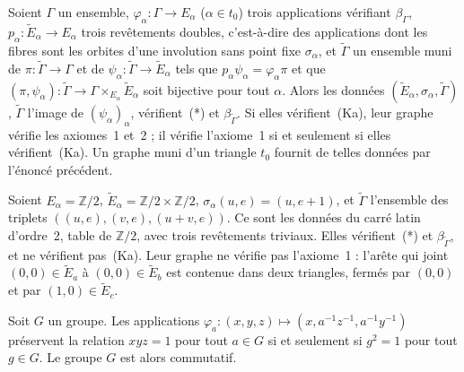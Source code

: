 \begin{enonce}
Soient $\Gamma$ un ensemble, $\varphi_\alpha : \Gamma \to E_\alpha$ ($\alpha \in t_0$) trois applications vérifiant $\beta_\Gamma$, $p_\alpha : \widetilde E_\alpha \to E_\alpha$ trois revêtements doubles, c'est-à-dire des applications dont les fibres sont les orbites d'une involution sans point fixe $\sigma_\alpha$, et $\widetilde\Gamma$ un ensemble muni de $\pi : \widetilde\Gamma \to \Gamma$ et de $\psi_\alpha : \widetilde\Gamma \to \widetilde E_\alpha$ tels que $p_\alpha \psi_\alpha = \varphi_\alpha \pi$ et que $(\pi, \psi_\alpha) : \widetilde\Gamma \to \Gamma \times_{E_\alpha} \widetilde E_\alpha$ soit bijective pour tout $\alpha$. Alors les données $(\widetilde E_\alpha, \sigma_\alpha, \widetilde\Gamma)$, $\widetilde\Gamma$ l'image de $(\psi_\alpha)_\alpha$, vérifient~(*) et $\beta_{\widetilde\Gamma}$. Si elles vérifient~(Ka), leur graphe vérifie les axiomes~1 et~2 ; il vérifie l'axiome~1 si et seulement si elles vérifient~(Ka). Un graphe muni d'un triangle $t_0$ fournit de telles données par l'énoncé précédent.
\end{enonce}

\begin{encadre}
\begin{contrexemple*}
Soient $E_\alpha = \mathbb Z/2$, $\widetilde E_\alpha = \mathbb Z/2 \times \mathbb Z/2$, $\sigma_\alpha(u, e) = (u, e + 1)$, et $\widetilde\Gamma$ l'ensemble des triplets $((u, e), (v, e), (u + v, e))$. Ce sont les données du carré latin d'ordre~2, table de $\mathbb Z/2$, avec trois revêtements triviaux. Elles vérifient~(*) et $\beta_{\widetilde\Gamma}$, et ne vérifient pas~(Ka). Leur graphe ne vérifie pas l'axiome~1 : l'arête qui joint $(0,0) \in \widetilde E_a$ à $(0,0) \in \widetilde E_b$ est contenue dans deux triangles, fermés par $(0,0)$ et par $(1,0) \in \widetilde E_c$.
\end{contrexemple*}
\end{encadre}

\begin{enonce}
Soit $G$ un groupe. Les applications $\varphi_a : (x, y, z) \mapsto (x, a^{-1}z^{-1}, a^{-1}y^{-1})$ préservent la relation $xyz = 1$ pour tout $a \in G$ si et seulement si $g^2 = 1$ pour tout $g \in G$. Le groupe $G$ est alors commutatif.
\end{enonce}

